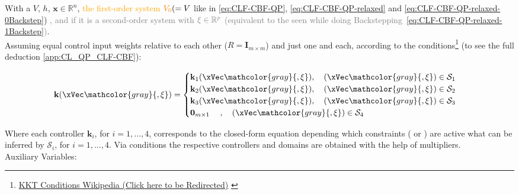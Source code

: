 With a  \(V\),  \(h\), \(\mathbf{x}\in\mathbb{R}^n\), \textcolor{orange}{the first-order system } \(\mathcolor{orange}{V_0} ( = V\) like in \eqref{eq:CLF-CBF-QP}, \eqref{eq:CLF-CBF-QP-relaxed} and \eqref{eq:CLF-CBF-QP-relaxed-0Backstep}) \textcolor{gray}{, and if it is a second-order system with} \(\mathcolor{gray}{\mathbf{\xi}\in\mathbb{R}^p}\) \textcolor{gray}{(equivalent to the  seen while doing Backstepping~\eqref{eq:CLF-CBF-QP-relaxed-1Backstep})}. \\


Assuming equal control input weights relative to each other (\(R = \mathbf{I}_{m \times m}\)) and just one  and  each, according to the  conditions\footnote{\href{https://en.wikipedia.org/wiki/Karush-Kuhn-Tucker_conditions}{KKT Conditions Wikipedia (Click here to be Redirected)} \label{foot: KKT_Conditions}} (to see the full deduction \ref{app:CL_QP_CLF-CBF}):

\begin{equation}
    \mathbf{k}(\xVec \mathcolor{gray}{, \mathbf{\xi}}) =
    \begin{cases}
        \mathbf{k}_1(\xVec \mathcolor{gray}{, \mathbf{\xi}}), \quad (\xVec \mathcolor{gray}{, \mathbf{\xi}}) \in \mathcal{S}_1 \\
        \mathbf{k}_2(\xVec \mathcolor{gray}{, \mathbf{\xi}}), \quad (\xVec \mathcolor{gray}{, \mathbf{\xi}}) \in \mathcal{S}_2 \\
        \mathbf{k}_3(\xVec \mathcolor{gray}{, \mathbf{\xi}}), \quad (\xVec \mathcolor{gray}{, \mathbf{\xi}}) \in \mathcal{S}_3 \\
        \mathbf{0}_{m \times 1 } \quad  \hspace{0.25em}, \quad (\xVec \mathcolor{gray}{, \mathbf{\xi}}) \in \mathcal{S}_4
    \end{cases}
    \label{eq:closed-form_controller}
\end{equation}


Where each controller \(\mathbf{k}_i\), for \( i = 1, ..., 4 \), corresponds to the closed-form equation depending which constraints ( or ) are active what can be inferred by \(\mathcal{S}_i\), for \( i = 1, ..., 4 \). Via  conditions the respective  controllers and domains are obtained with the help of  multipliers.\\

Auxiliary Variables:

